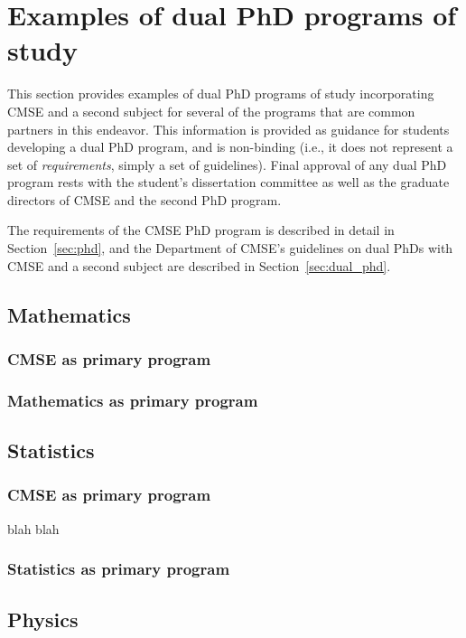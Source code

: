 \section{Examples of dual PhD programs of study}
\label{sec:dual_phd_examples}

This section provides examples of dual PhD programs of study
incorporating CMSE and a second subject for several of the programs
that are common partners in this endeavor.   This information is provided
as guidance for students developing a dual PhD program, and
is non-binding (i.e., it does not represent a set of
\textit{requirements}, simply a set of guidelines).  Final approval of
any dual PhD program rests with the student's dissertation
committee as well as the graduate directors of CMSE and the second PhD
program.

The requirements of the CMSE PhD program is described in
detail in Section~\ref{sec:phd}, and the Department of CMSE's
guidelines on dual PhDs with CMSE and a second
subject are described in Section~\ref{sec:dual_phd}.

\subsection{Mathematics}

\subsubsection{CMSE as primary program}

\subsubsection{Mathematics as primary program}

\subsection{Statistics}

\subsubsection{CMSE as primary program}

blah blah

\subsubsection{Statistics as primary program}

\subsection{Physics}

